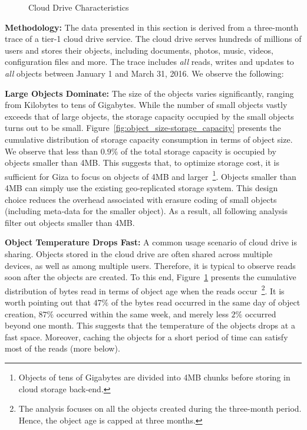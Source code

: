 \begin{figure}[tp]
\begin{subfigure}{.3\textwidth}
  \caption{}
  \label{fig:write_read_gap-bytes_read}
\end{subfigure}%
\caption{Cloud Drive Characteristics}
\label{fig:case_for_giza}
\end{figure}

{\bf Methodology:} The data presented in this section is derived from a three-month trace of a tier-1 cloud drive service. The cloud drive serves hundreds of millions of users and stores their objects, including documents, photos, music, videos, configuration files and more. The trace includes {\em all} reads, writes and updates to {\em all} objects between January 1 and March 31, 2016. We observe the following:

{\bf Large Objects Dominate:} The size of the objects varies significantly, ranging from Kilobytes to tens of Gigabytes. While the number of small objects vastly exceeds that of large objects, the storage capacity occupied by the small objects turns out to be small. Figure~\ref{fig:object_size-storage_capacity} presents the cumulative distribution of storage capacity consumption in terms of object size. We observe that less than $0.9\%$ of the total storage capacity is occupied by objects smaller than 4MB. This suggests that, to optimize storage cost, it is sufficient for Giza to focus on objects of 4MB and larger~\footnote{Objects of tens of Gigabytes are divided into 4MB chunks before storing in cloud storage back-end.}. Objects smaller than 4MB can simply use the existing geo-replicated storage system. This design choice reduces the overhead associated with erasure coding of small objects (including meta-data for the smaller object). As a result, all following analysis filter out objects smaller than 4MB.

{\bf Object Temperature Drops Fast:} A common usage scenario of cloud drive is sharing. Objects stored in the cloud drive are often shared across multiple devices, as well as among multiple users. Therefore, it is typical to observe reads soon after the objects are created. To this end, Figure~\ref{fig:write_read_gap-bytes_read} presents the cumulative distribution of bytes read in terms of object age when the reads occur~\footnote{The analysis focuses on all the objects created during the three-month period. Hence, the object age is capped at three months.}. It is worth pointing out that $47\%$ of the bytes read occurred in the same day of object creation, $87\%$ occurred within the same week, and merely less $2\%$ occurred beyond one month. This suggests that the temperature of the objects drops at a fast space. Moreover, caching the objects for a short period of time can satisfy most of the reads (more below).

